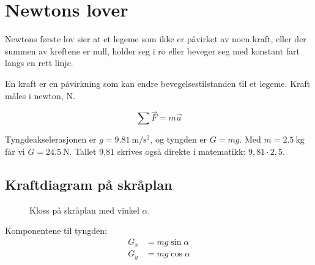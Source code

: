\section{Newtons lover}

Newtons første lov sier at et legeme som ikke er påvirket av noen kraft, eller der summen av kreftene er null, holder seg i ro eller beveger seg med konstant fart langs en rett linje.

\begin{definisjon}[Kraft]
En kraft er en påvirkning som kan endre bevegelsestilstanden til et legeme. Kraft måles i newton, \unit{\newton}.
\end{definisjon}

\begin{formel}
\[
  \sum \vec{F} = m\vec{a}
\]
\end{formel}

Tyngdeakselerasjonen er $g = \qty{9.81}{\meter\per\second\squared}$, og tyngden er $G = mg$. Med $m = \qty{2,5}{\kilo\gram}$ får vi $G = \qty{24.5}{\newton}$. Tallet 9,81 skrives også direkte i matematikk: $9,81 \cdot 2,5$.

\subsection{Kraftdiagram på skråplan}

\begin{figure}[H]
\centering
{}
\caption{Kloss på skråplan med vinkel $\alpha$.}
\end{figure}

Komponentene til tyngden:
\begin{align*}
  G_x &= mg\sin\alpha \\
  G_y &= mg\cos\alpha
\end{align*}

